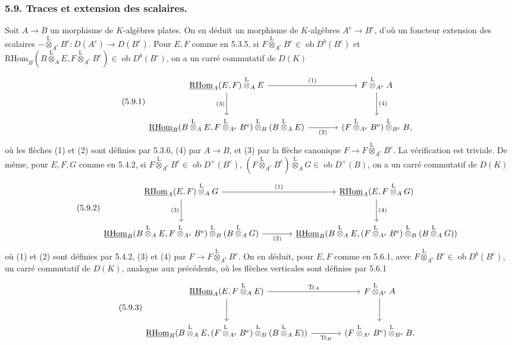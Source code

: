 \documentclass[11pt]{article}
\newcommand{\R}{\mathrm{R}}\newcommand{\RHomCore}{\mathrm{RHom}}
\newcommand{\ob}{\operatorname{ob}}
\providecommand{\RHom}{\RHomCore}
\providecommand{\uRHom}{\underline{\RHom}}
\providecommand{\Tr}{\operatorname{Tr}}
\providecommand{\Tr}{\operatorname{Tr}}
\providecommand{\lten}{\overset{\mathrm L}{\otimes}}
\providecommand{\Tr}{\operatorname{Tr}}
\providecommand{\RHom}{\RHomCore}
\providecommand{\ob}{\operatorname{ob}}
\providecommand{\lten}{\overset{\mathrm L}{\otimes}}
\providecommand{\RHom}{\R\mathcal{H}om}
\providecommand{\lten}{\overset{\mathrm L}{\otimes}}
\providecommand{\R}{\mathrm R}
\providecommand{\Tr}{\operatorname{Tr}}
\providecommand{\lten}{\overset{\mathrm L}{\otimes}}
\providecommand{\lten}{\overset{\mathrm L}{\otimes}}
\providecommand{\lten}{\overset{\mathrm L}{\otimes}}
\providecommand{\RHom}{\RHomCore}
\providecommand{\Tr}{\operatorname{Tr}}
\providecommand{\lten}{\overset{\mathrm L}{\otimes}}
\begin{document}
\subsubsection*{5.9. Traces et extension des scalaires.}

Soit $A\to B$ un morphisme de $K$-algèbres plates. On en déduit un morphisme de $K$-algèbres $A^e\to B^e$, d'où un foncteur extension des scalaires $-\lten_{A^e}B^e:D(A^e)\to D(B^e)$. Pour $E,F$ comme en 5.3.5, si $F\lten_{A^e}B^e\in\ob D^b(B^e)$ et $\uRHom_B(B\lten_AE,F\lten_{A^e}B^e)\in\ob D^b(B^\circ)$, on a un carré commutatif de $D(K)$
\begin{equation}\tag{5.9.1}
\begin{tikzcd}[column sep=large,row sep=large]
\uRHom_A(E,F)\lten_AE \arrow[r,"(1)"] \arrow[d,"(3)"'] & F\lten_{A^e}A \arrow[d,"(4)"]\\
\uRHom_B(B\lten_AE,F\lten_{A^e}B^e)\lten_B(B\lten_AE) \arrow[r,"(2)"'] & (F\lten_{A^e}B^e)\lten_{B^e}B,
\end{tikzcd}
\end{equation}
où les flèches (1) et (2) sont définies par 5.3.6, (4) par $A\to B$, et (3) par la flèche canonique $F\to F\lten_{A^e}B^e$. La vérification est triviale. De même, pour $E,F,G$ comme en 5.4.2, si $F\lten_{A^e}B^e\in\ob D^+(B^e)$, $(F\lten_{A^e}B^e)\lten_AG\in\ob D^+(B)$, on 
a un
carré commutatif de $D(K)$
\begin{equation}\tag{5.9.2}
\begin{tikzcd}[column sep=large,row sep=large]
\uRHom_A(E,F)\lten_AG \arrow[r,"(1)"] \arrow[d,"(3)"'] & \uRHom_A(E,F\lten_AG) \arrow[d,"(4)"]\\
\uRHom_B(B\lten_AE,F\lten_{A^e}B^e)\lten_B(B\lten_AG) \arrow[r,"(2)"'] & \uRHom_B(B\lten_AE,(F\lten_{A^e}B^e)\lten_B(B\lten_AG))
\end{tikzcd}
\end{equation}
où (1) et (2) sont définies par 5.4.2, (3) et (4) par $F\to F\lten_{A^e}B^e$. On en déduit, pour $E,F$ comme en 5.6.1, avec $F\lten_{A^e}B^e\in\ob D^b(B^e)$, un carré commutatif de $D(K)$, analogue aux précédents, où les flèches verticales sont définies par 5.6.1
\begin{equation}\tag{5.9.3}
\begin{tikzcd}[column sep=large,row sep=large]
\uRHom_A(E,F\lten_AE) \arrow[r,"\Tr_A"] \arrow[d] & F\lten_{A^e}A \arrow[d]\\
\uRHom_B(B\lten_AE,(F\lten_{A^e}B^e)\lten_B(B\lten_AE)) \arrow[r,"\Tr_B"'] & (F\lten_{A^e}B^e)\lten_{B^e}B.
\end{tikzcd}
\end{equation}
\end{document}
